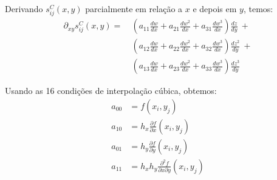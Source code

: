 \documentclass[a4paper, 12pt]{article}
\begin{document}
Derivando $s_{ij}^C(x,y)$ parcialmente em relação a $x$ e depois em $y$, temos:
\begin{align*}
    \partial_{xy}s_{ij}^C(x, y) =\ &\left(a_{11}\frac{dw}{dx} + a_{21}\frac{dw^2}{dx} + a_{31}\frac{dw^3}{dx}\right)
                            \frac{dz}{dy}\ + \\ 
                            &\left(a_{12}\frac{dw}{dx} + a_{22}\frac{dw^2}{dx} + a_{32}\frac{dw^3}{dx}\right)
                            \frac{dz^2}{dy}\ + \\ 
                            &\left(a_{13}\frac{dw}{dx} + a_{23}\frac{dw^2}{dx} + a_{33}\frac{dw^3}{dx}\right)
                            \frac{dz^3}{dy} 
\end{align*}

Usando as 16 condições de interpolação cúbica, obtemos:
\begin{align}
    a_{00} &= f(x_{i}, y_{j}) \tag{1}\\
    a_{10} &= h_{x} \frac{\partial f}{\partial x}(x_{i}, y_{j}) \tag{5} \\
    a_{01} &= h_{y} \frac{\partial f}{\partial y}(x_i, y_j) \tag{9} \\
    a_{11} &= h_x h_y \frac{\partial^2 f}{\partial x \partial y}(x_i, y_j) \tag{13} \\
\end{align}
\end{document}
